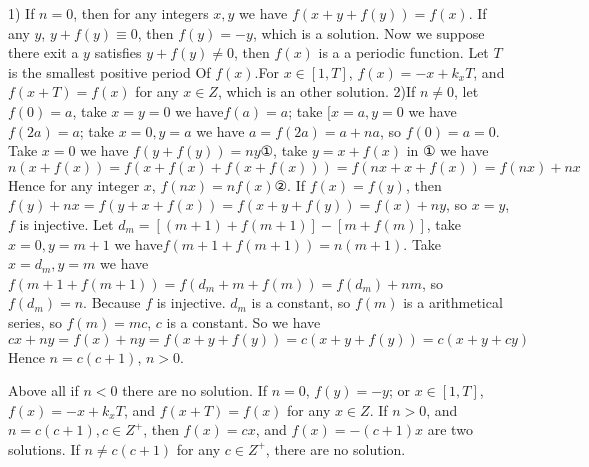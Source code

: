 


\begin{solution}
	1) If $n = 0$, then for any integers $x,y$ we have $f\left( {x + y + f(y)} \right) = f(x)$.
	If any $y$, $y + f(y) \equiv 0$, then $f(y) =  - y$, which is a solution.
Now we suppose there exit a $y$ satisfies $y + f(y) \ne 0$, then $f(x)$ is a a periodic function. Let $T$ is the smallest positive period Of $f(x)$.For $x \in \left[ {1,T} \right]$, $f(x) =  - x + {k_x}T$, and$f(x + T) = f(x)$ for any $x \in Z$, which is an other solution.
2)If $n \ne 0$, let $f(0) = a$, take $x = y = 0$ we have$f(a) = a$;  take $[x = a, y = 0$ we have $f(2a) = a$; take $x = 0, y = a$ we have $a = f(2a) = a + na$, so $f(0) = a = 0$.
	Take $x = 0$ we have $f\left( {y + f(y)} \right) = ny$①, take $y = x + f(x)$ in ① we have
$n\left( {x + f(x)} \right) = f\left( {x + f(x) + f\left( {x + f(x)} \right)} \right) = f\left( {nx + x + f(x)} \right) = f(nx) + nx$
Hence for any integer $x$, $f(nx) = nf(x)$②.
If $f(x) = f(y)$, then $f(y) + nx = f\left( {y + x + f(x)} \right) = f\left( {x + y + f(y)} \right) = f(x) + ny$,
so $x = y$, $f$ is injective.
Let ${d_m} = \left[ {(m + 1) + f(m + 1)} \right] - \left[ {m + f(m)} \right]$, take $x = 0,y = m + 1$ we have$f\left( {m + 1 + f(m + 1)} \right) = n(m + 1)$.
Take $x = {d_m},y = m$ we have$f\left( {m + 1 + f(m + 1)} \right) = f\left( {{d_m} + m + f(m)} \right) = f({d_m}) + nm$, so $f({d_m}) = n$. Because $f$ is injective. ${d_m}$ is a constant, so $f(m)$ is a arithmetical series, so $f(m) = mc$, $c$ is a  constant. So we have 
$cx + ny = f(x) + ny = f\left( {x + y + f(y)} \right) = c\left( {x + y + f(y)} \right) = c\left( {x + y + cy} \right)$
Hence $n = c(c + 1)$, $n > 0$.

Above all if $n < 0$ there are no solution.
If $n = 0$, $f(y) =  - y$; or $x \in \left[ {1,T} \right]$, $f(x) =  - x + {k_x}T$, and $f(x + T) = f(x)$ for any $x \in Z$.
If $n > 0$, and $n = c(c + 1),c \in {Z^ + }$, then $f(x) = cx$, and $f(x) =  - (c + 1)x$ are two solutions.
If $n \ne c(c + 1)$ for any $c \in {Z^ + }$, there are no solution.
\end{solution}



